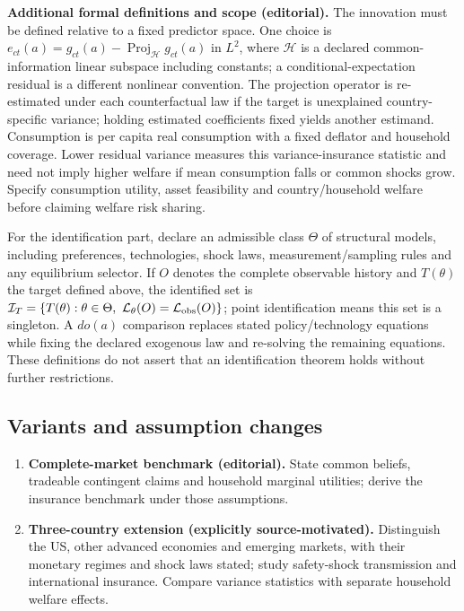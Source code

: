 \documentclass[11pt,a4paper]{article}
\begin{document}
\textbf{Additional formal definitions and scope (editorial).} The innovation must be defined relative to a fixed predictor space. One choice is \(e_{ct}(a)=g_{ct}(a)-\operatorname{Proj}_{\mathcal H}g_{ct}(a)\) in \(L^2\), where \(\mathcal H\) is a declared common-information linear subspace including constants; a conditional-expectation residual is a different nonlinear convention. The projection operator is re-estimated under each counterfactual law if the target is unexplained country-specific variance; holding estimated coefficients fixed yields another estimand. Consumption is per capita real consumption with a fixed deflator and household coverage. Lower residual variance measures this variance-insurance statistic and need not imply higher welfare if mean consumption falls or common shocks grow. Specify consumption utility, asset feasibility and country/household welfare before claiming welfare risk sharing.

For the identification part, declare an admissible class \(\Theta\) of structural models, including preferences, technologies, shock laws, measurement/sampling rules and any equilibrium selector. If \(O\) denotes the complete observable history and \(T(\theta)\) the target defined above, the identified set is \(\mathcal I_T=\{T(\theta):\theta\in\Theta,\ \mathcal L_\theta(O)=\mathcal L_{\rm obs}(O)\}\); point identification means this set is a singleton. A \(do(a)\) comparison replaces stated policy/technology equations while fixing the declared exogenous law and re-solving the remaining equations. These definitions do not assert that an identification theorem holds without further restrictions.
\subsection*{Variants and assumption changes}
\begin{enumerate}
\item \textbf{Complete-market benchmark (editorial).} State common beliefs, tradeable contingent claims and household marginal utilities; derive the insurance benchmark under those assumptions.
\item \textbf{Three-country extension (explicitly source-motivated).} Distinguish the US, other advanced economies and emerging markets, with their monetary regimes and shock laws stated; study safety-shock transmission and international insurance. Compare variance statistics with separate household welfare effects.
\end{enumerate}
\end{document}
